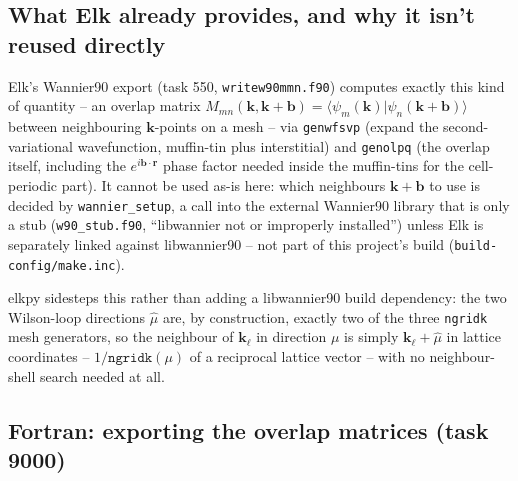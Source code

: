 \documentclass[11pt]{article}
\begin{document}
\subsection{What Elk already provides, and why it isn't reused directly}

Elk's Wannier90 export (task 550, \texttt{writew90mmn.f90}) computes exactly this kind
of quantity -- an overlap matrix $M_{mn}(\mathbf k,\mathbf k+\mathbf b) = \langle
\psi_m(\mathbf k)|\psi_n(\mathbf k+\mathbf b)\rangle$ between neighbouring $\mathbf
k$-points on a mesh -- via \texttt{genwfsvp} (expand the second-variational
wavefunction, muffin-tin plus interstitial) and \texttt{genolpq} (the overlap itself,
including the $e^{i\mathbf b\cdot\mathbf r}$ phase factor needed inside the muffin-tins
for the cell-periodic part). It cannot be used as-is here: which neighbours
$\mathbf k+\mathbf b$ to use is decided by \texttt{wannier\_setup}, a call into the
external Wannier90 library that is only a stub (\texttt{w90\_stub.f90}, ``libwannier not
or improperly installed'') unless Elk is separately linked against libwannier90 -- not
part of this project's build (\texttt{build-config/make.inc}).

elkpy sidesteps this rather than adding a libwannier90 build dependency: the two
Wilson-loop directions $\hat\mu$ are, by construction, exactly two of the three
\texttt{ngridk} mesh generators, so the neighbour of $\mathbf k_\ell$ in direction $\mu$
is simply $\mathbf k_\ell + \hat\mu$ in lattice coordinates -- $1/\texttt{ngridk}(\mu)$
of a reciprocal lattice vector -- with no neighbour-shell search needed at all.

\subsection{Fortran: exporting the overlap matrices (task 9000)}
\end{document}
